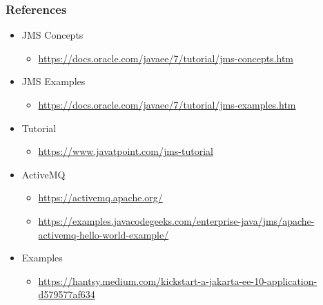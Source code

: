 \documentclass[10pt,xcolor=pdflatex]{beamer}
\begin{document}
\begin{frame}[containsverbatim]\frametitle{References}
\begin{itemize}
    \item JMS Concepts
	  \begin{itemize}
		\item \url{https://docs.oracle.com/javaee/7/tutorial/jms-concepts.htm}
	  \end{itemize}
    \item JMS Examples
	  \begin{itemize}
		\item \url{https://docs.oracle.com/javaee/7/tutorial/jms-examples.htm}
	  \end{itemize}
	\item Tutorial
	  \begin{itemize}
	      \item \url{https://www.javatpoint.com/jms-tutorial}
	  \end{itemize}
	\item ActiveMQ
	  \begin{itemize}
	    \item \url{https://activemq.apache.org/}
	    \item \url{https://examples.javacodegeeks.com/enterprise-java/jms/apache-activemq-hello-world-example/}
	  \end{itemize}
   \item Examples
     \begin{itemize}
         \item \url{https://hantsy.medium.com/kickstart-a-jakarta-ee-10-application-d579577af634}
     \end{itemize}
\end{itemize}
\end{frame}

\end{document}
